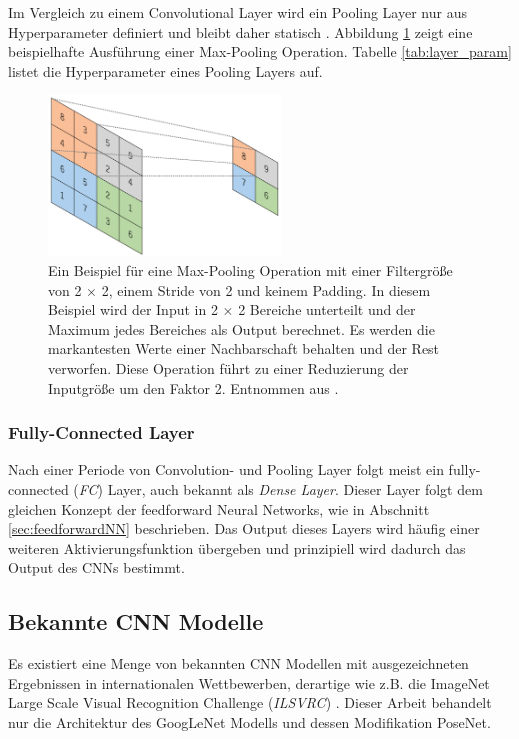  Im Vergleich zu einem Convolutional Layer wird ein Pooling Layer nur aus Hyperparameter definiert und bleibt daher statisch \cite{yamashitaConvolutionalNeuralNetworks2018}. Abbildung \ref{fig:pooling_layer} zeigt eine beispielhafte Ausführung einer Max-Pooling Operation. Tabelle \ref{tab:layer_param} listet die Hyperparameter eines Pooling Layers auf.
 \begin{figure}
	\centering
	\includegraphics[width=0.55\textwidth]{images/ann_conv/max_pool.png}
	\caption{Ein Beispiel für eine Max-Pooling Operation mit einer Filtergröße von 2 $\times$ 2, einem Stride von 2 und keinem Padding. In diesem Beispiel wird der Input in 2 $\times$ 2 Bereiche unterteilt und der Maximum jedes Bereiches als Output berechnet. Es werden die markantesten Werte einer Nachbarschaft behalten und der Rest verworfen. Diese Operation führt zu einer Reduzierung der Inputgröße um den Faktor 2. Entnommen aus \cite{yamashitaConvolutionalNeuralNetworks2018}.}
	\label{fig:pooling_layer}
\end{figure}



\subsubsection{Fully-Connected Layer}
Nach einer Periode von Convolution- und Pooling Layer folgt meist ein fully-connected (\textit{FC}) Layer, auch bekannt als \textit{Dense Layer}. Dieser Layer folgt dem gleichen Konzept der feedforward Neural Networks, wie in Abschnitt \ref{sec:feedforwardNN} beschrieben. Das Output dieses Layers wird häufig einer weiteren Aktivierungsfunktion übergeben \cite{yamashitaConvolutionalNeuralNetworks2018} und prinzipiell wird dadurch das Output des CNNs bestimmt.

\subsection{Bekannte CNN Modelle}
Es existiert eine Menge von bekannten CNN Modellen mit ausgezeichneten Ergebnissen in internationalen Wettbewerben, derartige wie z.B. die ImageNet Large Scale Visual Recognition Challenge (\textit{ILSVRC}) \cite{russakovskyImageNetLargeScale2015}. Dieser Arbeit behandelt nur die Architektur des GoogLeNet Modells und dessen Modifikation PoseNet.

